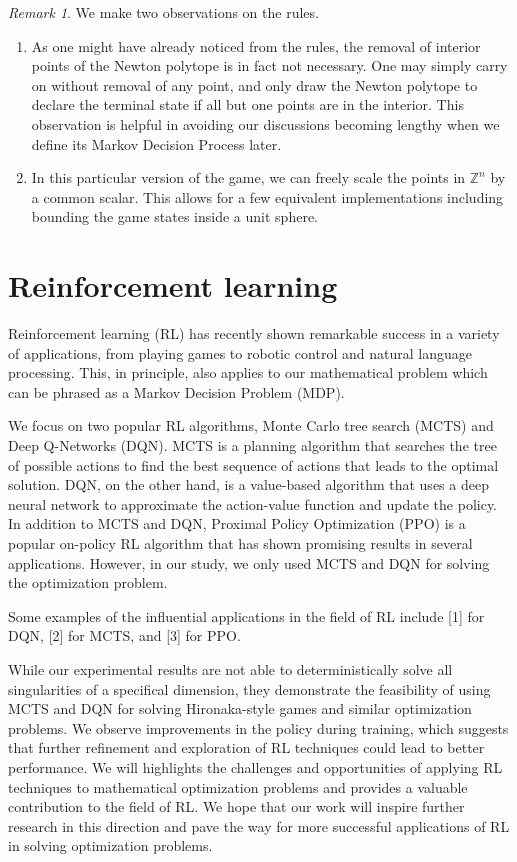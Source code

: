 \documentclass{article}
\theoremstyle{plain}
\theoremstyle{definition}
\theoremstyle{remark}
\newtheorem{remark}[theorem]{Remark}
\begin{document}
\begin{remark} We make two observations on the rules. 
\begin{enumerate}
    \item As one might have already noticed from the rules, the removal of interior points of the Newton polytope is in fact not necessary. One may simply carry on without removal of any point, and only draw the Newton polytope to declare the terminal state if all but one points are in the interior. This observation is helpful in avoiding our discussions becoming lengthy when we define its Markov Decision Process later.
    \item In this particular version of the game, we can freely scale the points in $\mathbb Z^n$ by a common scalar. This allows for a few equivalent implementations including bounding the game states inside a unit sphere.
\end{enumerate}
\end{remark}


\section{Reinforcement learning}

Reinforcement learning (RL) has recently shown remarkable success in a variety of applications, from playing games to robotic control and natural language processing. This, in principle, also applies to our mathematical problem which can be phrased as a Markov Decision Problem (MDP).

We focus on two popular RL algorithms, Monte Carlo tree search (MCTS) and Deep Q-Networks (DQN). MCTS is a planning algorithm that searches the tree of possible actions to find the best sequence of actions that leads to the optimal solution. DQN, on the other hand, is a value-based algorithm that uses a deep neural network to approximate the action-value function and update the policy. In addition to MCTS and DQN, Proximal Policy Optimization (PPO) is a popular on-policy RL algorithm that has shown promising results in several applications. However, in our study, we only used MCTS and DQN for solving the optimization problem.

Some examples of the influential applications in the field of RL include [1] for DQN, [2] for MCTS, and [3] for PPO.

While our experimental results are not able to deterministically solve all singularities of a specifical dimension, they demonstrate the feasibility of using MCTS and DQN for solving Hironaka-style games and similar optimization problems. We observe improvements in the policy during training, which suggests that further refinement and exploration of RL techniques could lead to better performance. We will highlights the challenges and opportunities of applying RL techniques to mathematical optimization problems and provides a valuable contribution to the field of RL. We hope that our work will inspire further research in this direction and pave the way for more successful applications of RL in solving optimization problems.
\end{document}
